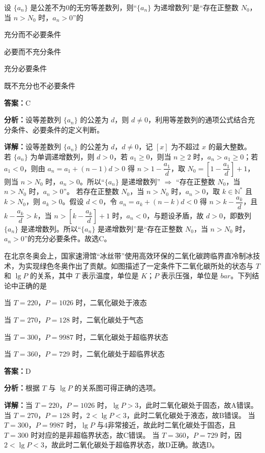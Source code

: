 \begin{question}[points=4]
设 $\{a_n\}$ 是公差不为0的无穷等差数列，则“$\{a_n\}$ 为递增数列”是“存在正整数 $N_0$，当 $n > N_0$ 时，$a_n > 0$”的
\begin{choices}
  \item 充分而不必要条件
  \item 必要而不充分条件
  \item 充分必要条件
  \item 既不充分也不必要条件
\end{choices}
\begin{solution}
\textbf{答案：}C

\textbf{分析：}设等差数列 $\{a_n\}$ 的公差为 $d$，则 $d \neq 0$，利用等差数列的通项公式结合充分条件、必要条件的定义判断。

\textbf{详解：}设等差数列 $\{a_n\}$ 的公差为 $d$，$d \neq 0$，记 $[x]$ 为不超过 $x$ 的最大整数。
若 $\{a_n\}$ 为单调递增数列，则 $d > 0$，若 $a_1 \ge 0$，则当 $n \ge 2$ 时，$a_n > a_1 \ge 0$；若 $a_1 < 0$，则由 $a_n = a_1 + (n-1)d > 0$ 得 $n > 1 - \dfrac{a_1}{d}$，取 $N_0 = \left[1 - \dfrac{a_1}{d}\right] + 1$，则当 $n > N_0$ 时，$a_n > 0$。所以“$\{a_n\}$ 是递增数列” $\Rightarrow$ “存在正整数 $N_0$，当 $n > N_0$ 时，$a_n > 0$”。
若存在正整数 $N_0$，当 $n > N_0$ 时，$a_n > 0$，取 $k \in \mathbb{N}^*$ 且 $k > N_0$，则 $a_k > 0$。假设 $d < 0$，令 $a_n = a_k + (n-k)d < 0$ 得 $n > k - \dfrac{a_k}{d}$，且 $k - \dfrac{a_k}{d} > k$，当 $n > \left[k - \dfrac{a_k}{d}\right] + 1$ 时，$a_n < 0$，与题设矛盾，故 $d > 0$，即数列 $\{a_n\}$ 是递增数列。所以“$\{a_n\}$ 是递增数列”是“存在正整数 $N_0$，当 $n > N_0$ 时，$a_n > 0$”的充分必要条件。故选C。
\end{solution}
\end{question}

\begin{question}[points=4]
在北京冬奥会上，国家速滑馆“冰丝带”使用高效环保的二氧化碳跨临界直冷制冰技术，为实现绿色冬奥作出了贡献。如图描述了一定条件下二氧化碳所处的状态与 $T$ 和 $\lg P$ 的关系，其中 $T$ 表示温度，单位是 $K$；$P$ 表示压强，单位是 $bar$。下列结论中正确的是
\begin{choices}
  \item 当 $T = 220$，$P = 1026$ 时，二氧化碳处于液态
  \item 当 $T = 270$，$P = 128$ 时，二氧化碳处于气态
  \item 当 $T = 300$，$P = 9987$ 时，二氧化碳处于超临界状态
  \item 当 $T = 360$，$P = 729$ 时，二氧化碳处于超临界状态
\end{choices}
\begin{solution}
\textbf{答案：}D

\textbf{分析：}根据 $T$ 与 $\lg P$ 的关系图可得正确的选项。

\textbf{详解：}当 $T = 220$，$P = 1026$ 时，$\lg P > 3$，此时二氧化碳处于固态，故A错误。
当 $T = 270$，$P = 128$ 时，$2 < \lg P < 3$，此时二氧化碳处于液态，故B错误。
当 $T = 300$，$P = 9987$ 时，$\lg P$ 与4非常接近，故此时二氧化碳处于固态，且 $T=300$ 时对应的是非超临界状态，故C错误。
当 $T = 360$，$P = 729$ 时，因 $2 < \lg P < 3$，故此时二氧化碳处于超临界状态，故D正确。故选D。
\end{solution}
\end{question}

